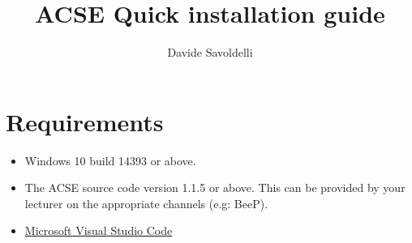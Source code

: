 \documentclass{article}
\begin{document}
\title{ACSE Quick installation guide}
\author{Davide Savoldelli}

\maketitle

\section{Requirements}
\begin{itemize}
    \item Windows 10 build 14393 or above.
    \item The ACSE source code version 1.1.5 or above. This can be provided by your lecturer on the appropriate channels (e.g: BeeP).
    \item \href{https://code.visualstudio.com/}{Microsoft Visual Studio Code}
\end{itemize}
\end{document}
